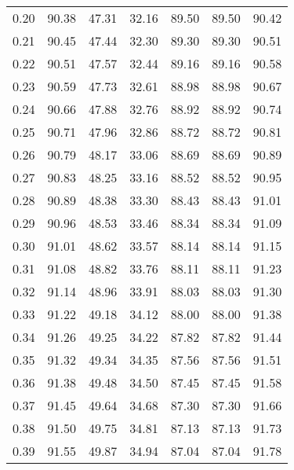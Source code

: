 \begin{tabular}{|c|c|c|c|c|c|c|}
      0.20 &     90.38 &     47.31 &      32.16 &   89.50 &      89.50 &         90.42 \\
      0.21 &     90.45 &     47.44 &      32.30 &   89.30 &      89.30 &         90.51 \\
      0.22 &     90.51 &     47.57 &      32.44 &   89.16 &      89.16 &         90.58 \\
      0.23 &     90.59 &     47.73 &      32.61 &   88.98 &      88.98 &         90.67 \\
      0.24 &     90.66 &     47.88 &      32.76 &   88.92 &      88.92 &         90.74 \\
      0.25 &     90.71 &     47.96 &      32.86 &   88.72 &      88.72 &         90.81 \\
      0.26 &     90.79 &     48.17 &      33.06 &   88.69 &      88.69 &         90.89 \\
      0.27 &     90.83 &     48.25 &      33.16 &   88.52 &      88.52 &         90.95 \\
      0.28 &     90.89 &     48.38 &      33.30 &   88.43 &      88.43 &         91.01 \\
      0.29 &     90.96 &     48.53 &      33.46 &   88.34 &      88.34 &         91.09 \\
      0.30 &     91.01 &     48.62 &      33.57 &   88.14 &      88.14 &         91.15 \\
      0.31 &     91.08 &     48.82 &      33.76 &   88.11 &      88.11 &         91.23 \\
      0.32 &     91.14 &     48.96 &      33.91 &   88.03 &      88.03 &         91.30 \\
      0.33 &     91.22 &     49.18 &      34.12 &   88.00 &      88.00 &         91.38 \\
      0.34 &     91.26 &     49.25 &      34.22 &   87.82 &      87.82 &         91.44 \\
      0.35 &     91.32 &     49.34 &      34.35 &   87.56 &      87.56 &         91.51 \\
      0.36 &     91.38 &     49.48 &      34.50 &   87.45 &      87.45 &         91.58 \\
      0.37 &     91.45 &     49.64 &      34.68 &   87.30 &      87.30 &         91.66 \\
      0.38 &     91.50 &     49.75 &      34.81 &   87.13 &      87.13 &         91.73 \\
      0.39 &     91.55 &     49.87 &      34.94 &   87.04 &      87.04 &         91.78 \\

\end{tabular}

